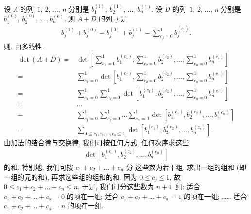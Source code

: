 \documentclass[../libro.tex]{subfiles}
\begin{document}
\begin{example}
    设 \(A\) 的列~\(1\), \(2\), \(\dots\), \(n\)
    分别是 \(b_1^{(1)}\), \(b_2^{(1)}\), \(\dots\), \(b_n^{(1)}\).
    设 \(D\) 的列~\(1\), \(2\), \(\dots\), \(n\)
    分别是 \(b_1^{(0)}\), \(b_2^{(0)}\), \(\dots\), \(b_n^{(0)}\).
    则 \(A + D\) 的列~\(j\) 是
    \begin{align*}
        b_j^{(1)} + b_j^{(0)}
        = b_j^{(0)} + b_j^{(1)}
        = \sum_{c_j = 0}^{1} {b_j^{(c_j)}}.
    \end{align*}
    则, 由多线性,
    \begin{align*}
        \det {(A + D)}
        = {} &
        \det {\left[
                \sum_{c_1 = 0}^{1} b_1^{(c_1)},
                \sum_{c_2 = 0}^{1} b_2^{(c_2)},
                \dots,
                \sum_{c_n = 0}^{1} b_n^{(c_n)}
        \right]}
        \\
        = {} &
        \sum_{c_1 = 0}^{1}
        \det {\left[
                b_1^{(c_1)},
                \sum_{c_2 = 0}^{1} b_2^{(c_2)},
                \dots,
                \sum_{c_n = 0}^{1} b_n^{(c_n)}
        \right]}
        \\
        = {} &
        \sum_{c_1 = 0}^{1}
        \sum_{c_2 = 0}^{1}
        \det {\left[
                b_1^{(c_1)},
                b_2^{(c_2)},
                \dots,
                \sum_{c_n = 0}^{1} b_n^{(c_n)}
        \right]}
        \\
        = {} &
        \dots
        \\
        = {} &
        \sum_{c_1 = 0}^{1}
        \sum_{c_2 = 0}^{1}
        \dots
        \sum_{c_n = 0}^{1}
        \det {[b_1^{(c_1)}, b_2^{(c_2)}, \dots, b_n^{(c_n)}]}
        \\
        = {} &
        \sum_{0 \leq c_1, c_2, \dots, c_n \leq 1}
        \det {[b_1^{(c_1)}, b_2^{(c_2)}, \dots, b_n^{(c_n)}]}.
    \end{align*}
    由加法的结合律与交换律,
    我们可按任何方式, 任何次序求这些
    \begin{align*}
        \det {[b_1^{(c_1)}, b_2^{(c_2)}, \dots, b_n^{(c_n)}]}
    \end{align*}
    的和.
    特别地, 我们可按 \(c_1 + c_2 + \dots + c_n\) 分%
    这些数为若干组,
    求出一组的组和 (即一组的元的和),
    再求这些组的组和的和.
    因为 \(0 \leq c_j \leq 1\),
    故 \(0 \leq c_1 + c_2 + \dots + c_n \leq n\).
    于是, 我们可分这些数为 \(n+1\)~组:
    适合 \(c_1 + c_2 + \dots + c_n = 0\) 的项在一组;
    适合 \(c_1 + c_2 + \dots + c_n = 1\) 的项在一组;
    ……
    适合 \(c_1 + c_2 + \dots + c_n = n\) 的项在一组.

\end{example}
\end{document}
